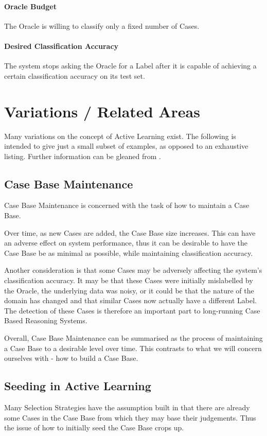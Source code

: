 \documentclass[a4paper,11pt]{report}
\begin{document}
\paragraph{Oracle Budget} 
The Oracle is willing to classify only a fixed number of Cases.

\paragraph{Desired Classification Accuracy} 
The system stops asking the Oracle for a Label after it is capable of achieving a certain classification accuracy on its test set.

\section{Variations / Related Areas}
Many variations on the concept of Active Learning exist. The following is intended to give just a small subset of examples, as opposed to an exhaustive listing. Further information can be gleaned from \citet{Settles2010}.

\subsection{Case Base Maintenance}
Case Base Maintenance is concerned with the task of how to maintain a Case Base. 

Over time, as new Cases are added, the Case Base size increases. This can have an adverse effect on system performance, thus it can be desirable to have the Case Base be as minimal as possible, while maintaining classification accuracy.

Another consideration is that some Cases may be adversely affecting the system's classification accuracy. It may be that these Cases were initially mislabelled by the Oracle, the underlying data was noisy, or it could be that the nature of the domain has changed and that similar Cases now actually have a different Label. The detection of these Cases is therefore an important part to long-running Case Based Reasoning Systems.

Overall, Case Base Maintenance can be summarised as the process of maintaining a Case Base to a desirable level over time. This contrasts to what we will concern ourselves with - how to build a Case Base.

\subsection{Seeding in Active Learning}
Many Selection Strategies have the assumption built in that there are already some Cases in the Case Base from which they may base their judgements. Thus the issue of how to initially seed the Case Base crops up.
\end{document}

